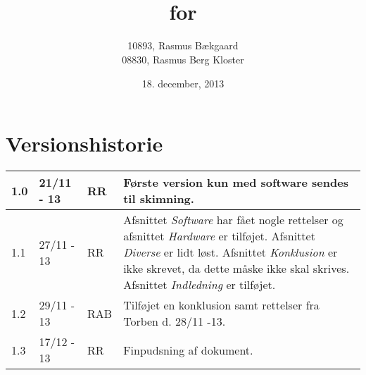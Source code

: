 \documentclass[oneside, 12pt]{memoir}
\title{\DocumentType \\ for \\ \ProjectName}
\date{18. december, 2013}
\author{10893, Rasmus Bækgaard\\08830, Rasmus Berg Kloster}
\begin{document}
\begin{titlingpage}
	
\end{titlingpage}


\section*{Versionshistorie}
\begin{tabular}{p{}|p{}|p{}|p{}}
\hline 
1.0 & 21/11 - 13 & RR & Første version kun med software sendes til skimning.
\\ \hline
1.1 & 27/11 - 13 & RR & Afsnittet \textit{Software} har fået nogle rettelser og afsnittet \textit{Hardware} er tilføjet. Afsnittet \textit{Diverse} er lidt løst.
Afsnittet \textit{Konklusion} er ikke skrevet, da dette måske ikke skal skrives.
Afsnittet \textit{Indledning} er tilføjet.
\\ \hline
1.2 & 29/11 - 13 & RAB & Tilføjet en konklusion samt rettelser fra Torben d. 28/11 -13.\\
1.3 & 17/12 - 13 & RR & Finpudsning af dokument. \\ \hline
\end{tabular} 




\newpage
\tableofcontents*
\listoffigures* 

\listoffixmes 







\newpage
\appendix



\end{document}
